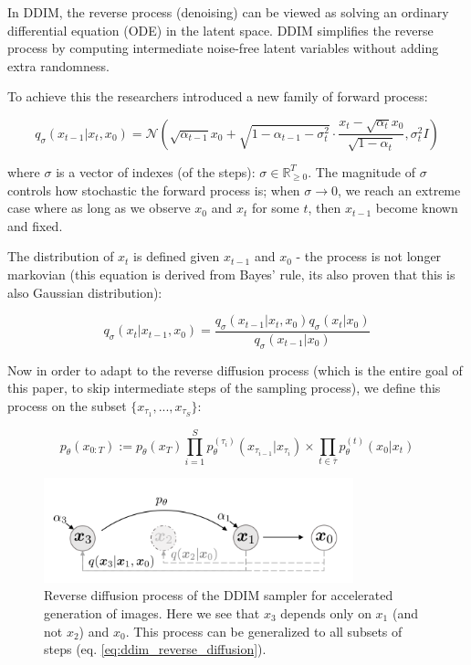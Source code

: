 In DDIM, the reverse process (denoising) can be viewed as solving an ordinary differential equation (ODE) in the latent space. DDIM simplifies the reverse process by computing intermediate noise-free latent variables without adding extra randomness.

To achieve this the researchers introduced a new family of forward process:

\begin{equation*}
    q_\sigma (x_{t-1} | x_t, x_0) = \mathcal{N} (\sqrt{\alpha_{t-1}} x_0 + \sqrt{1 - \alpha_{t-1} - \sigma_t^2} \cdot \frac{x_t - \sqrt{\alpha_t} x_0}{\sqrt{1 - \alpha_t}}, \sigma_t^2 I)
\end{equation*}

where $\sigma$ is a vector of indexes (of the steps): $\sigma \in \mathbb{R}^T_{\geq 0}$. The magnitude of $\sigma$ controls how stochastic the forward process is; when $\sigma \rightarrow 0$, we reach an extreme case where as long as we observe $x_0$ and $x_t$ for some $t$, then $x_{t-1}$ become known and fixed.

The distribution of $x_t$ is defined given $x_{t-1}$ and $x_0$ - the process is not longer markovian (this equation is derived from Bayes' rule, its also proven that this is also Gaussian distribution):

\begin{equation*}
    q_\sigma (x_t | x_{t-1}, x_0) = \frac{q_\sigma (x_{t-1} | x_t, x_0) q_\sigma (x_t | x_0)}{q_\sigma (x_{t-1} | x_0)}
\end{equation*}

Now in order to adapt to the reverse diffusion process (which is the entire goal of this paper, to skip intermediate steps of the sampling process), we define this process on the subset $\{ x_{\tau_1}, ..., x_{\tau_S} \}$:

\begin{equation}
    p_\theta (x_{0:T}) := p_\theta (x_T) \prod_{i=1}^{S} p_\theta^{(\tau_i)} (x_{\tau_{i-1}} | x_{\tau_i}) \times \prod_{t \in \bar{\tau}} p_\theta^{(t)} (x_0 | x_t)
    \label{eq:ddim_reverse_diffusion}
\end{equation}

\begin{figure}
    \centering
    \includegraphics[width=0.8\textwidth]{images/diffusion_models/stable_diffusion/ddim_sampling_process.png}
    \caption{Reverse diffusion process of the DDIM sampler \cite{ddim} for accelerated generation of images. Here we see that $x_3$ depends only on $x_1$ (and not $x_2$) and $x_0$. This process can be generalized to all subsets of steps (eq. \ref{eq:ddim_reverse_diffusion}).}
    \label{fig:ddim_sampling_process}
\end{figure}

